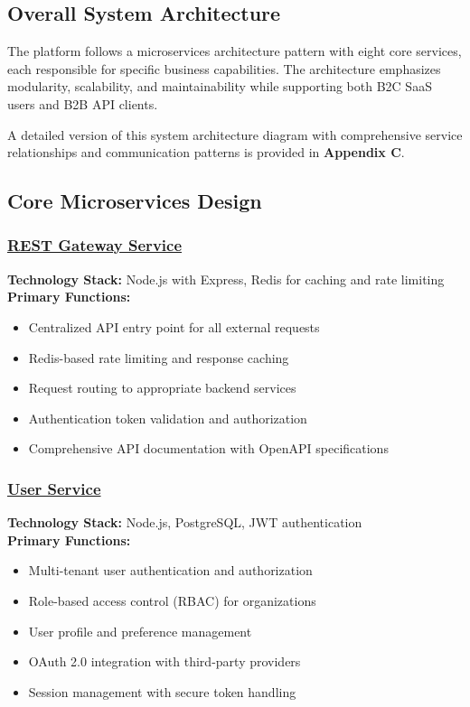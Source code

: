 \subsection{Overall System Architecture}
The platform follows a microservices architecture pattern with eight core services, each responsible for specific business capabilities. The architecture emphasizes modularity, scalability, and maintainability while supporting both B2C SaaS users and B2B API clients.

A detailed version of this system architecture diagram with comprehensive service relationships and communication patterns is provided in \textbf{Appendix C}.

\subsection{Core Microservices Design}

\subsubsection*{\underline{REST Gateway Service}}
\textbf{Technology Stack:} Node.js with Express, Redis for caching and rate limiting\\
\textbf{Primary Functions:}
\begin{itemize}
    \item Centralized API entry point for all external requests
    \item Redis-based rate limiting and response caching
    \item Request routing to appropriate backend services
    \item Authentication token validation and authorization
    \item Comprehensive API documentation with OpenAPI specifications
\end{itemize}

\subsubsection*{\underline{User Service}}
\textbf{Technology Stack:} Node.js, PostgreSQL, JWT authentication\\
\textbf{Primary Functions:}
\begin{itemize}
    \item Multi-tenant user authentication and authorization
    \item Role-based access control (RBAC) for organizations
    \item User profile and preference management
    \item OAuth 2.0 integration with third-party providers
    \item Session management with secure token handling
\end{itemize}

